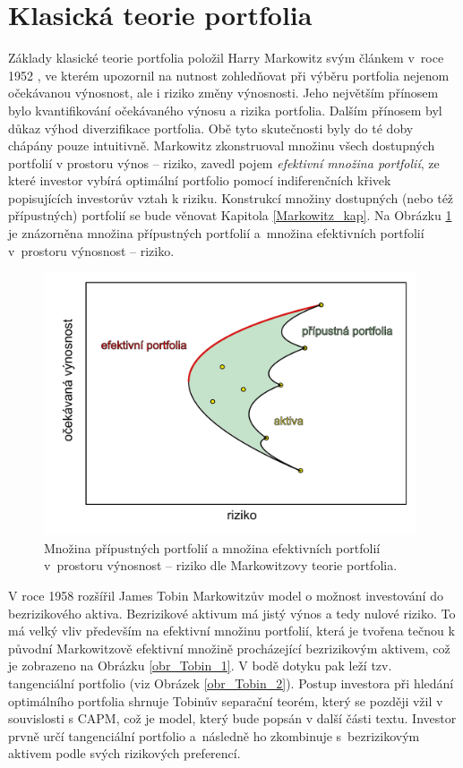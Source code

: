 \documentclass[a4paper,12pt]{report}
\theoremstyle{definition} \newtheorem{definice}[veta]{Definice}
\theoremstyle{remark}
\begin{document}


\section{Klasická teorie portfolia}\label{KTP}

Základy klasické teorie portfolia položil Harry Markowitz svým článkem v~roce 1952 \cite{markowitz}, ve kterém upozornil na nutnost zohledňovat při výběru portfolia nejenom očekávanou výnosnost, ale i riziko změny výnosnosti.
Jeho největším přínosem bylo kvantifikování očekávaného výnosu a rizika portfolia. 
Dalším přínosem byl důkaz výhod diverzifikace portfolia.
Obě tyto skutečnosti byly do té doby chápány pouze intuitivně.
Markowitz zkonstruoval množinu všech dostupných portfolií v prostoru výnos -- riziko, zavedl pojem \textit{efektivní množina portfolií}, ze které investor vybírá optimální portfolio pomocí indiferenčních křivek popisujících investorův vztah k riziku.
Konstrukcí množiny dostupných (nebo též přípustných) portfolií se bude věnovat Kapitola \ref{Markowitz_kap}. 
Na Obrázku \ref{obr_Markowitz} je znázorněna množina přípustných portfolií  a~množina efektivních portfolií v~prostoru výnosnost -- riziko. 

\begin{figure}[!htbp]
  \centering 
  \includegraphics[width=11cm]{IMG/graf_2a.pdf}
  \caption{Množina přípustných portfolií  a množina efektivních portfolií v~prostoru výnosnost -- riziko dle Markowitzovy teorie portfolia.} 
  \label{obr_Markowitz}
\end{figure}

V roce 1958 rozšířil James Tobin \cite{tobin} Markowitzův model o možnost investování do bezrizikového aktiva.
Bezrizikové aktivum má jistý výnos a tedy nulové riziko.
To má velký vliv především na efektivní množinu portfolií, která je tvořena tečnou k původní Markowitzově efektivní množině procházející bezrizikovým aktivem, což je zobrazeno na Obrázku \ref{obr_Tobin_1}.
V bodě dotyku pak leží tzv. tangenciální portfolio (viz Obrázek \ref{obr_Tobin_2}).
Postup investora při hledání optimálního portfolia shrnuje Tobinův separační teorém, který se později vžil v souvislosti s CAPM, což je model, který bude popsán v další části textu. %
Investor prvně určí tangenciální portfolio a~následně ho zkombinuje s~bezrizikovým aktivem podle svých rizikových preferencí.
\end{document}

